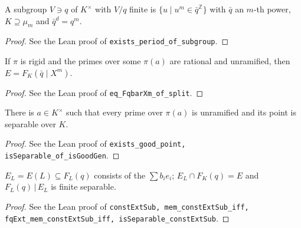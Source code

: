 \begin{lemma}
\label{lem:XVIII-period-group}
\leanok
A subgroup $V\ni q$ of $K^\times$ with $V/q$ finite is $\{u\mid u^m\in\bar q^{\mathbb Z}\}$ with $\bar q$ an $m$-th power, $K\supseteq\mu_m$ and $\bar q^d=q^m$.
\end{lemma}
\begin{proof}
\leanok
See the Lean proof of \texttt{exists\_period\_of\_subgroup}.
\end{proof}

\begin{lemma}
\label{lem:XVIII-split}
\leanok
If $\pi$ is rigid and the primes over some $\pi(a)$ are rational and unramified, then $E=F_K(\bar q\mid X^m)$.
\end{lemma}
\begin{proof}
\leanok
See the Lean proof of \texttt{eq\_FqbarXm\_of\_split}.
\end{proof}

\begin{lemma}
\label{lem:XVIII-good-point}
\leanok
There is $a\in K^\times$ such that every prime over $\pi(a)$ is unramified and its point is separable over $K$.
\end{lemma}
\begin{proof}
\leanok
See the Lean proof of \texttt{exists\_good\_point, isSeparable\_of\_isGoodGen}.
\end{proof}

\begin{lemma}
\label{lem:const-ext-sub}
\leanok
$E_L=E(L)\subseteq F_L(q)$ consists of the $\sum b_i e_i$; $E_L\cap F_K(q)=E$ and $F_L(q)\,|\,E_L$ is finite separable.
\end{lemma}
\begin{proof}
\leanok
See the Lean proof of \texttt{constExtSub, mem\_constExtSub\_iff, fqExt\_mem\_constExtSub\_iff, isSeparable\_constExtSub}.
\end{proof}

